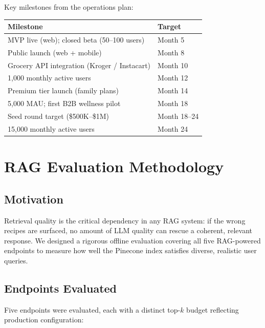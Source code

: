 \documentclass[12pt,letterpaper]{article}
\begin{document}
Key milestones from the operations plan:

\begin{center}
\small
\begin{tabular}{L{8cm} C{3cm}}
  \toprule
  \textbf{Milestone} & \textbf{Target} \\
  \midrule
  MVP live (web); closed beta (50--100 users)   & Month 5  \\
  Public launch (web + mobile)                   & Month 8  \\
  Grocery API integration (Kroger / Instacart)   & Month 10 \\
  1,000 monthly active users                     & Month 12 \\
  Premium tier launch (family plans)             & Month 14 \\
  5,000 MAU; first B2B wellness pilot            & Month 18 \\
  Seed round target (\$500K--\$1M)               & Month 18--24 \\
  15,000 monthly active users                    & Month 24 \\
  \bottomrule
\end{tabular}
\end{center}

\section{RAG Evaluation Methodology}
\label{sec:eval-method}

\subsection{Motivation}

Retrieval quality is the critical dependency in any RAG system: if the wrong recipes are
surfaced, no amount of LLM quality can rescue a coherent, relevant response. We designed
a rigorous offline evaluation covering all five RAG-powered endpoints to measure how
well the Pinecone index satisfies diverse, realistic user queries.

\subsection{Endpoints Evaluated}

Five endpoints were evaluated, each with a distinct top-$k$ budget reflecting production
configuration:
\end{document}

